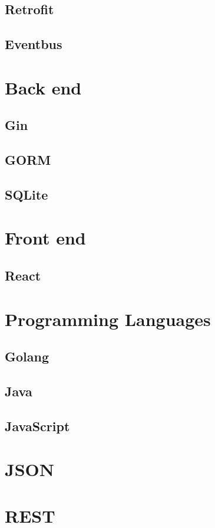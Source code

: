 \documentclass[../Main/thesis.tex]{subfiles}
\begin{document}
\subsection{Retrofit}
\subsection{Eventbus}


\section{Back end}
\subsection{Gin}
\subsection{GORM}
\subsection{SQLite}


\section{Front end}
\subsection{React}

\section{Programming Languages}
\subsection{Golang}
\subsection{Java}
\subsection{JavaScript}

\section{JSON}

\section{REST}
\end{document}
